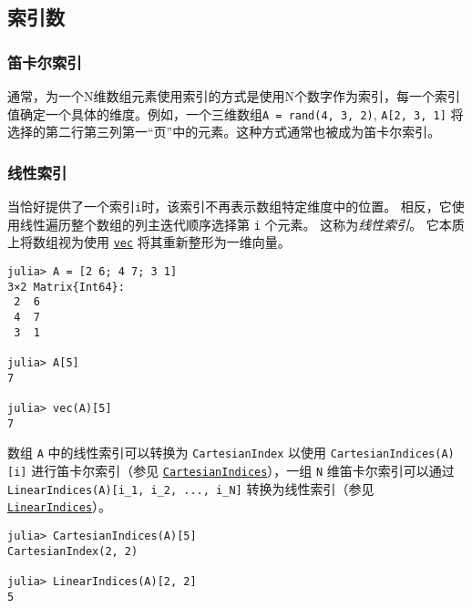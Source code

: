 \subsection{索引数}



\hypertarget{16914248248713404385}{}


\subsubsection{笛卡尔索引}



通常，为一个N维数组元素使用索引的方式是使用N个数字作为索引，每一个索引值确定一个具体的维度。例如，一个三维数组\texttt{A = rand(4, 3, 2)}, \texttt{A[2, 3, 1]} 将选择的第二行第三列第一“页”中的元素。这种方式通常也被成为笛卡尔索引。



\hypertarget{9085041942168456552}{}


\subsubsection{线性索引}



当恰好提供了一个索引\texttt{i}时，该索引不再表示数组特定维度中的位置。 相反，它使用线性遍历整个数组的列主迭代顺序选择第 \texttt{i} 个元素。 这称为\emph{线性索引}。 它本质上将数组视为使用 \hyperlink{18435874855636770528}{\texttt{vec}} 将其重新整形为一维向量。




\begin{verbatim}
julia> A = [2 6; 4 7; 3 1]
3×2 Matrix{Int64}:
 2  6
 4  7
 3  1

julia> A[5]
7

julia> vec(A)[5]
7
\end{verbatim}



数组 \texttt{A} 中的线性索引可以转换为 \texttt{CartesianIndex} 以使用 \texttt{CartesianIndices(A)[i]} 进行笛卡尔索引（参见 \hyperlink{16831958174907250244}{\texttt{CartesianIndices}}），一组 \texttt{N} 维笛卡尔索引可以通过\texttt{LinearIndices(A)[i\_1, i\_2, ..., i\_N]} 转换为线性索引（参见\hyperlink{12250457823889413092}{\texttt{LinearIndices}}）。




\begin{verbatim}
julia> CartesianIndices(A)[5]
CartesianIndex(2, 2)

julia> LinearIndices(A)[2, 2]
5
\end{verbatim}



